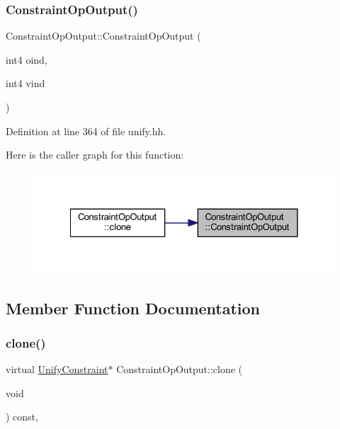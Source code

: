 \subsubsection{\texorpdfstring{ConstraintOpOutput()}{ConstraintOpOutput()}}
{\footnotesize\ttfamily Constraint\+Op\+Output\+::\+Constraint\+Op\+Output (\begin{DoxyParamCaption}\item[{int4}]{oind,  }\item[{int4}]{vind }\end{DoxyParamCaption})\hspace{0.3cm}{\ttfamily [inline]}}



Definition at line 364 of file unify.\+hh.

Here is the caller graph for this function\+:
\nopagebreak
\begin{figure}[H]
\begin{center}
\leavevmode
\includegraphics[width=328pt]{class_constraint_op_output_a1b7658d327e2bf08bd8c6c2b74b43bef_icgraph}
\end{center}
\end{figure}


\subsection{Member Function Documentation}
\mbox{\label{class_constraint_op_output_a1545d669aef376aab9cd317c19e47fb7}} 
\subsubsection{\texorpdfstring{clone()}{clone()}}
{\footnotesize\ttfamily virtual \mbox{\hyperlink{class_unify_constraint}{Unify\+Constraint}}$\ast$ Constraint\+Op\+Output\+::clone (\begin{DoxyParamCaption}\item[{void}]{ }\end{DoxyParamCaption}) const\hspace{0.3cm}{\ttfamily [inline]}, {\ttfamily [virtual]}}



